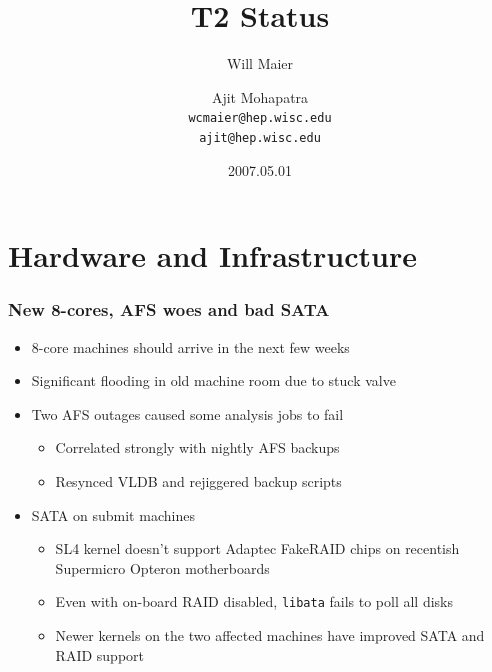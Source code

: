 \documentclass{beamer}
\title{T2 Status}
\author[Maier, Mohapatra]{
    Will Maier \and Ajit Mohapatra\\ 
    {\tt wcmaier@hep.wisc.edu}\\
    {\tt ajit@hep.wisc.edu}}
\institute[Wisconsin]{University of Wisconsin - High Energy Physics}
\date{2007.05.01}
\begin{document}
\begin{frame}
    \titlepage
\end{frame}


\section{Hardware and Infrastructure}
\begin{frame}[fragile]
\frametitle{New 8-cores, AFS woes and bad SATA}
\begin{itemize}
    \item 8-core machines should arrive in the next few weeks
    \item Significant flooding in old machine room due to stuck valve
    \item Two AFS outages caused some analysis jobs to fail
    \begin{itemize}
        \item Correlated strongly with nightly AFS backups
        \item Resynced VLDB and rejiggered backup scripts
    \end{itemize}
    \item SATA on submit machines
    \begin{itemize}
        \item SL4 kernel doesn't support Adaptec FakeRAID chips on recentish 
        Supermicro Opteron motherboards\footnotemark{}
        \item Even with on-board RAID disabled, {\tt libata} fails to poll all disks
        \item Newer kernels on the two affected machines have improved SATA and RAID support
    \end{itemize}
\end{itemize}

\end{frame}
\end{document}
